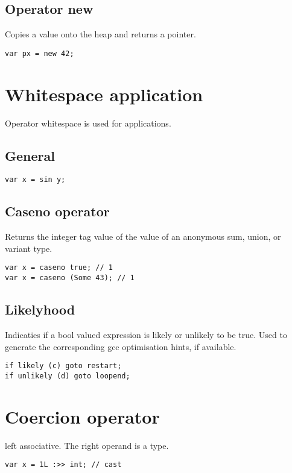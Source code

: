 \documentclass[oneside]{book}
\begin{document}
\subsection{Operator new}
Copies a value onto the heap and returns a pointer.

\begin{verbatim}
var px = new 42;
\end{verbatim}


\section{Whitespace application}
Operator whitespace is used for applications.
\subsection{General}

\begin{verbatim}
var x = sin y;
\end{verbatim}


\subsection{Caseno operator}
Returns the integer tag value of the value of an anonymous sum, 
union, or variant  type.

\begin{verbatim}
var x = caseno true; // 1
var x = caseno (Some 43); // 1
\end{verbatim}


\subsection{Likelyhood}
Indicaties if a bool valued expression is likely
or unlikely to be true. Used to generate the corresponding
gcc optimisation hints, if available.

\begin{verbatim}
if likely (c) goto restart;
if unlikely (d) goto loopend;
\end{verbatim}


\section{Coercion operator}
left associative. The right operand is a type.

\begin{verbatim}
var x = 1L :>> int; // cast
\end{verbatim}
\end{document}
